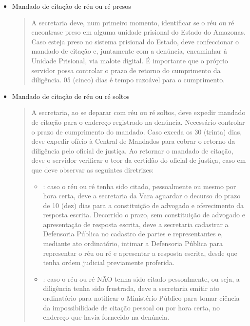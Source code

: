 \documentclass[letterpaper,10pt,brazil]{sphinxmanual}
\begin{document}
\begin{itemize}
\item {} 
\sphinxAtStartPar
Mandado de citação de réu ou ré presos
\begin{quote}

\sphinxAtStartPar
A secretaria deve, num primeiro momento, identificar se o réu ou ré encontra\sphinxhyphen{}se preso em alguma unidade prisional do Estado do Amazonas.
Caso esteja preso no sistema prisional do Estado, deve confeccionar o mandado de citação e, juntamente com a denúncia, encaminhar à Unidade Prisional, via malote digital.
É importante que o próprio servidor possa controlar o prazo de retorno do cumprimento da diligência. 05 (cinco) dias é tempo razoável para o cumprimento.
\end{quote}

\item {} 
\sphinxAtStartPar
Mandado de citação de réu ou ré soltos
\begin{quote}

\sphinxAtStartPar
A secretaria, ao se deparar com réu ou ré soltos, deve expedir mandado de citação para o endereço registrado na denúncia.
Necessário controlar o prazo de cumprimento do mandado. Caso exceda os 30 (trinta) dias, deve expedir ofício à Central de Mandados para cobrar o retorno da diligência pelo oficial de justiça.
Ao retornar o mandado de citação, deve o servidor verificar o teor da certidão do oficial de justiça, caso em que deve observar as seguintes diretrizes:
\begin{itemize}
\item {} 
\sphinxAtStartPar
{}: caso o réu ou ré tenha sido citado, pessoalmente ou mesmo por hora certa, deve a secretaria da Vara aguardar o decurso do prazo de 10 (dez) dias para a constituição de advogado e oferecimento da resposta escrita. Decorrido o prazo, sem constituição de advogado e apresentação de resposta escrita, deve a secretaria cadastrar a Defensoria Pública no cadastro de partes e representantes e, mediante ato ordinatório, intimar a Defensoria Pública para representar o réu ou ré e apresentar a resposta escrita, desde que tenha ordem judicial previamente proferida.

\item {} 
\sphinxAtStartPar
{}: caso o réu ou ré NÃO tenha sido citado pessoalmente, ou seja, a diligência tenha sido frustrada, deve a secretaria emitir ato ordinatório para notificar o Ministério Público para tomar ciência da impossibilidade de citação pessoal ou por hora certa, no endereço que havia fornecido na denúncia.


\end{itemize}
\end{quote}
\end{itemize}
\end{document}
